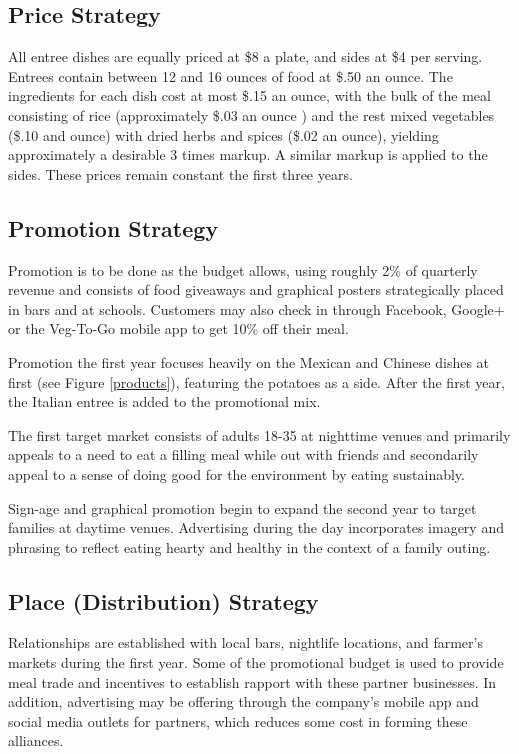 \documentclass[12pt, letterpaper]{article}
\begin{document}
\subsection{Price Strategy}
All entree dishes are equally priced at \$8 a plate, and sides at \$4 per serving. Entrees contain between 12 and 16 ounces of food at \$.50 an ounce. The ingredients for each dish cost at most \$.15 an ounce, with the bulk of the meal consisting of rice (approximately \$.03 an ounce \cite{costs}) and the rest mixed vegetables (\$.10 and ounce) with dried herbs and spices (\$.02 an ounce), yielding approximately a desirable 3 times markup. A similar markup is applied to the sides.  These prices remain constant the first three years.
\subsection{Promotion Strategy}
Promotion is to be done as the budget allows, using roughly 2\% of quarterly revenue and consists of food giveaways and graphical posters strategically placed in bars and at schools.  Customers may also check in through Facebook, Google+ or the Veg-To-Go mobile app to get 10\% off their meal.

Promotion the first year focuses heavily on the Mexican and Chinese dishes at first (see Figure \ref{products}), featuring the potatoes as a side. After the first year, the Italian entree is added to the promotional mix.

The first target market consists of adults 18-35 at nighttime venues and primarily appeals to a need to eat a filling meal while out with friends and secondarily appeal to a sense of doing good for the environment by eating sustainably.

Sign-age and graphical promotion begin to expand the second year to target families at daytime venues.  Advertising during the day incorporates imagery and phrasing to reflect eating hearty and healthy in the context of a family outing.
\subsection{Place (Distribution) Strategy}
Relationships are established with local bars, nightlife locations, and farmer's markets during the first year.  Some of the promotional budget is used to provide meal trade and incentives to establish rapport with these partner businesses.  In addition, advertising may be offering through the company's mobile app and social media outlets for partners, which reduces some cost in forming these alliances.
\end{document}
